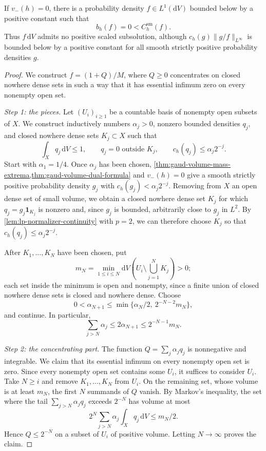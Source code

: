 \begin{theorem}\label{thm:smooth-tests-insufficient}
If $v_-(h)=0$, there is a probability density $f\in L^1(\mathrm{d}V)$ bounded below by a positive constant such that
\[
 b_h(f)=0<C_h^{\mathrm{sm}}(f).
\]
Thus $f\,\mathrm{d}V$ admits no positive scaled subsolution, although $c_h(g)\|g/f\|_{L^\infty}$ is bounded below by a positive constant for all smooth strictly positive probability densities $g$.
\end{theorem}
\begin{proof}
We construct $f=(1+Q)/M$, where $Q\geq0$ concentrates on closed nowhere dense sets in such a way that it has essential infimum zero on every nonempty open set.

\emph{Step 1: the pieces.} Let $(U_i)_{i\geq1}$ be a countable basis of nonempty open subsets of $X$. We construct inductively numbers $\alpha_j>0$, nonzero bounded densities $q_j$, and closed nowhere dense sets $K_j\subset X$ such that
\[
 \int_Xq_j\,\mathrm{d}V\leq1,\qquad
 q_j=0\text{ outside }K_j,\qquad
 c_h(q_j)\leq\alpha_j2^{-j}.
\]
Start with $\alpha_1=1/4$. Once $\alpha_j$ has been chosen, \cref{thm:gaud-volume-mass-extrema,thm:gaud-volume-dual-formula} and $v_-(h)=0$ give a smooth strictly positive probability density $g_j$ with $c_h(g_j)<\alpha_j2^{-j}$. Removing from $X$ an open dense set of small volume, we obtain a closed nowhere dense set $K_j$ for which $q_j=g_j\mathbf1_{K_j}$ is nonzero and, since $g_j$ is bounded, arbitrarily close to $g_j$ in $L^2$. By \cref{lem:lp-normalizer-continuity} with $p=2$, we can therefore choose $K_j$ so that $c_h(q_j)\leq\alpha_j2^{-j}$.

After $K_1,\ldots,K_N$ have been chosen, put
\[
 m_N=\min_{1\leq i\leq N}
    \mathrm{d}V\left(U_i\setminus\bigcup_{j=1}^NK_j\right)>0;
\]
each set inside the minimum is open and nonempty, since a finite union of closed nowhere dense sets is closed and nowhere dense. Choose
\[
 0<\alpha_{N+1}\leq
       \min\{\alpha_N/2,\ 2^{-N-2}m_N\},
\]
and continue. In particular,
\[
 \sum_{j>N}\alpha_j\leq2\alpha_{N+1}
             \leq2^{-N-1}m_N.
\]

\emph{Step 2: the concentrating part.} The function $Q=\sum_j\alpha_jq_j$ is nonnegative and integrable. We claim that its essential infimum on every nonempty open set is zero. Since every nonempty open set contains some $U_i$, it suffices to consider $U_i$. Take $N\geq i$ and remove $K_1,\ldots,K_N$ from $U_i$. On the remaining set, whose volume is at least $m_N$, the first $N$ summands of $Q$ vanish. By Markov's inequality, the set where the tail $\sum_{j>N}\alpha_jq_j$ exceeds $2^{-N}$ has volume at most
\[
 2^N\sum_{j>N}\alpha_j\int_Xq_j\,\mathrm{d}V
       \leq m_N/2.
\]
Hence $Q\leq2^{-N}$ on a subset of $U_i$ of positive volume. Letting $N\to\infty$ proves the claim.


\end{proof}
